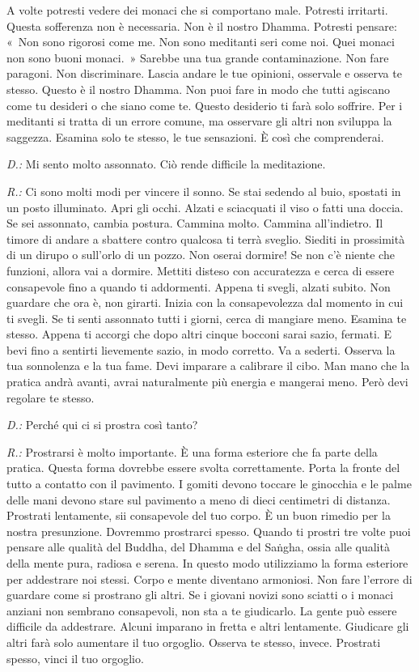 A volte potresti vedere dei monaci che si comportano male. Potresti
irritarti. Questa sofferenza non è necessaria. Non è il nostro Dhamma.
Potresti pensare: «~Non sono rigorosi come me. Non sono meditanti seri
come noi. Quei monaci non sono buoni monaci.~» Sarebbe una tua grande
contaminazione. Non fare paragoni. Non discriminare. Lascia andare le
tue opinioni, osservale e osserva te stesso. Questo è il nostro Dhamma.
Non puoi fare in modo che tutti agiscano come tu desideri o che siano
come te. Questo desiderio ti farà solo soffrire. Per i meditanti si
tratta di un errore comune, ma osservare gli altri non sviluppa la
saggezza. Esamina solo te stesso, le tue sensazioni. È così che
comprenderai.

\emph{D.:} Mi sento molto assonnato. Ciò rende difficile la meditazione.

\emph{R.:} Ci sono molti modi per vincere il sonno. Se stai sedendo al buio,
spostati in un posto illuminato. Apri gli occhi. Alzati e sciacquati il
viso o fatti una doccia. Se sei assonnato, cambia postura. Cammina
molto. Cammina all'indietro. Il timore di andare a sbattere contro
qualcosa ti terrà sveglio. Siediti in prossimità di un dirupo o
sull'orlo di un pozzo. Non oserai dormire! Se non c'è niente che
funzioni, allora vai a dormire. Mettiti disteso con accuratezza e cerca
di essere consapevole fino a quando ti addormenti. Appena ti svegli,
alzati subito. Non guardare che ora è, non girarti. Inizia con la
consapevolezza dal momento in cui ti svegli. Se ti senti assonnato tutti
i giorni, cerca di mangiare meno. Esamina te stesso. Appena ti accorgi
che dopo altri cinque bocconi sarai sazio, fermati. E bevi fino a
sentirti lievemente sazio, in modo corretto. Va a sederti. Osserva la
tua sonnolenza e la tua fame. Devi imparare a calibrare il cibo. Man
mano che la pratica andrà avanti, avrai naturalmente più energia e
mangerai meno. Però devi regolare te stesso.

\emph{D.:} Perché qui ci si prostra così tanto?

\emph{R.:} Prostrarsi è molto importante. È una forma esteriore che fa parte
della pratica. Questa forma dovrebbe essere svolta correttamente. Porta
la fronte del tutto a contatto con il pavimento. I gomiti devono toccare
le ginocchia e le palme delle mani devono stare sul pavimento a meno di
dieci centimetri di distanza. Prostrati lentamente, sii consapevole del
tuo corpo. È un buon rimedio per la nostra presunzione. Dovremmo
prostrarci spesso. Quando ti prostri tre volte puoi pensare alle qualità
del Buddha, del Dhamma e del Saṅgha, ossia alle qualità della mente
pura, radiosa e serena. In questo modo utilizziamo la forma esteriore
per addestrare noi stessi. Corpo e mente diventano armoniosi. Non fare
l'errore di guardare come si prostrano gli altri. Se i giovani novizi
sono sciatti o i monaci anziani non sembrano consapevoli, non sta a te
giudicarlo. La gente può essere difficile da addestrare. Alcuni imparano
in fretta e altri lentamente. Giudicare gli altri farà solo aumentare il
tuo orgoglio. Osserva te stesso, invece. Prostrati spesso, vinci il tuo
orgoglio.

